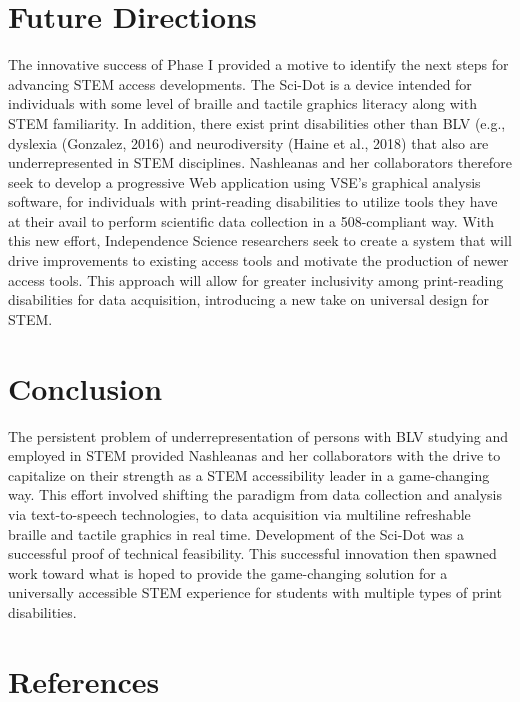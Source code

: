 \documentclass[11.5pt]{sig-alternate}
\begin{document}
\begin{large}
\section*{Future Directions}

The innovative success of Phase I provided a motive to identify the next steps for advancing STEM access developments. The Sci-Dot is a device intended for individuals with some level of braille and tactile graphics literacy along with STEM familiarity. In addition, there exist print disabilities other than BLV (e.g., dyslexia (Gonzalez, 2016) and neurodiversity (Haine et al., 2018) that also are underrepresented in STEM disciplines. Nashleanas and her collaborators therefore seek to develop a progressive Web application using VSE’s graphical analysis software, for individuals with print-reading disabilities to utilize tools they have at their avail to perform scientific data collection in a 508-compliant way. With this new effort, Independence Science researchers seek to create a system that will drive improvements to existing access tools and motivate the production of newer access tools. This approach will allow for greater inclusivity among print-reading disabilities for data acquisition, introducing a new take on universal design for STEM.

\section*{Conclusion}

The persistent problem of underrepresentation of persons with BLV studying and employed in STEM provided Nashleanas and her collaborators with the drive to capitalize on their strength as a STEM accessibility leader in a game-changing way. This effort involved shifting the paradigm from data collection and analysis via text-to-speech technologies, to data acquisition via multiline refreshable braille and tactile graphics in real time. Development of the Sci-Dot was a successful proof of technical feasibility. This successful innovation then spawned work toward what is hoped to provide the game-changing solution for a universally accessible STEM experience for students with multiple types of print disabilities.


 
\section*{References}\par 

\leftskip 0.25in
\parindent -0.25in 


\end{large}
\end{document}
